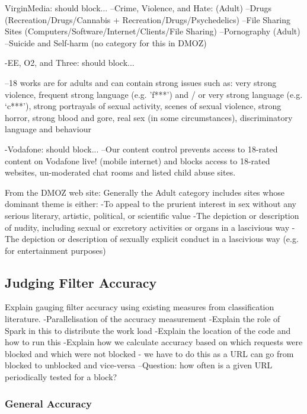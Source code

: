 \documentclass{bmcart}
\begin{document}
VirginMedia: should block...
--Crime, Violence, and Hate: (Adult)
--Drugs (Recreation/Drugs/Cannabis + Recreation/Drugs/Psychedelics)
--File Sharing Sites (Computers/Software/Internet/Clients/File Sharing)
--Pornography (Adult)
--Suicide and Self-harm (no category for this in DMOZ)


-EE, O2, and Three: should block...

--18 works are for adults and can contain strong issues such as: very strong violence, frequent strong language (e.g. 'f***') and / or very strong language (e.g. ‘c***’), strong portrayals of sexual activity, scenes of sexual violence, strong horror, strong blood and gore, real sex (in some circumstances), discriminatory language and behaviour

-Vodafone: should block...
--Our content control prevents access to 18-rated content on Vodafone live! (mobile internet) and blocks access to 18-rated websites, un-moderated chat rooms and listed child abuse sites.



From the DMOZ web site: 
Generally the Adult category includes sites whose dominant theme is either:
-To appeal to the prurient interest in sex without any serious literary, artistic, political, or scientific value
-The depiction or description of nudity, including sexual or excretory activities or organs in a lascivious way
-The depiction or description of sexually explicit conduct in a lascivious way (e.g. for entertainment purposes)



\subsection*{Judging Filter Accuracy}

Explain gauging filter accuracy using existing measures from classification literature.
-Parallelisation of the accuracy measurement
-Explain the role of Spark in this to distribute the work load
-Explain the location of the code and how to run this
-Explain how we calculate accuracy based on which requests were blocked and which were not blocked - we have to do this as a URL can go from blocked to unblocked and vice-versa
--Question: how often is a given URL periodically tested for a block?


\subsubsection*{General Accuracy}
\end{document}
